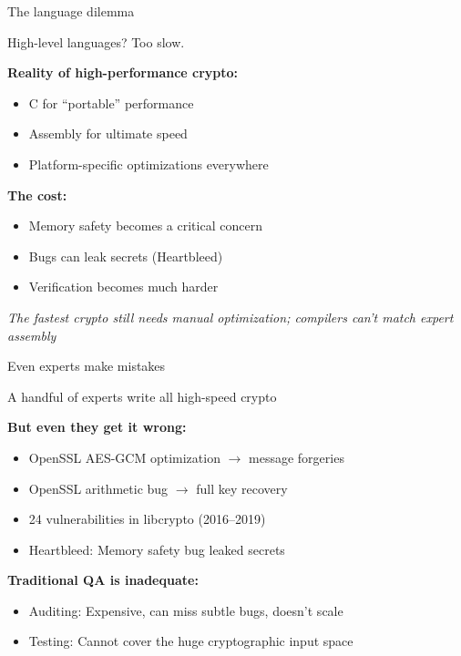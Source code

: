 \ifdefined\PRESENTATION\else\PassOptionsToClass{handout}{beamer}\fi\documentclass[aspectratio=169, lualatex]{beamer}
\begin{document}
\begin{frame}{The language dilemma}
	\begin{center}
		\Large
		High-level languages? Too slow.
	\end{center}
	\vspace{0.2em}
	\textbf{Reality of high-performance crypto:}
	\begin{itemize}
		\item C for ``portable'' performance
		\item Assembly for ultimate speed
		\item Platform-specific optimizations everywhere
	\end{itemize}
	\vspace{0.2em}
	\textbf{The cost:}
	\begin{itemize}
		\item Memory safety becomes a critical concern
		\item Bugs can leak secrets (Heartbleed)
		\item Verification becomes much harder
	\end{itemize}
	\vspace{0.1em}
	\begin{center}
		\textit{The fastest crypto still needs manual optimization; compilers can't match expert assembly}
	\end{center}
\end{frame}

\begin{frame}{Even experts make mistakes}
	\begin{center}
		\Large
		A handful of experts write all high-speed crypto
	\end{center}
	\vspace{0.5em}
	\textbf{But even they get it wrong:}
	\begin{itemize}
		\item OpenSSL AES-GCM optimization $\rightarrow$ message forgeries
		\item OpenSSL arithmetic bug $\rightarrow$ full key recovery
		\item 24 vulnerabilities in libcrypto (2016--2019)
		\item Heartbleed: Memory safety bug leaked secrets
	\end{itemize}
	\vspace{0.5em}
	\textbf{Traditional QA is inadequate:}
	\begin{itemize}
		\item Auditing: Expensive, can miss subtle bugs, doesn't scale
		\item Testing: Cannot cover the huge cryptographic input space
	\end{itemize}
\end{frame}
\end{document}
